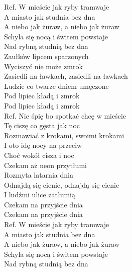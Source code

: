 
Ref. W mieście jak ryby tramwaje \\
 A miasto jak studnia bez dna \\
 A niebo jak żuraw, a niebo jak żuraw \\
 Schyla się nocą i świtem powstaje \\
 Nad rybną studnią bez dna \\
\hops
Zaułków lipcem sparzonych \tab{}\\
Wyciszyć nie może zmrok \tab{}\\
Zasiedli na ławkach, zasiedli na ławkach  \\
Ludzie co twarze dniem umęczone \\
Pod lipiec kładą i zmrok \tab{} \\
Pod lipiec kładą i zmrok \tab{} \\
\hops
Ref. Nie śpię bo spotkać chcę w mieście\\
 Tę ciszę co gęsta jak noc \\
 Rozmawiać z krokami, swoimi krokami \\
 I oto idę nocy na przeciw \\
 Choć wokół cisza i noc \\
\hops
Czekam aż neon przytłumi \\
Rozmyta latarnia dnia \\
Odnajdą się cienie, odnajdą się cienie \\
I ludźmi ulice zatłumią \\
Czekam na przyjście dnia \\
Czekam na przyjście dnia  \\
\hops
Ref. W mieście jak ryby tramwaje\\
 A miasto jak studnia bez dna \\
 A niebo jak żuraw, a niebo jak żuraw \\
 Schyla się nocą i świtem powstaje \\
 Nad rybną studnią bez dna
